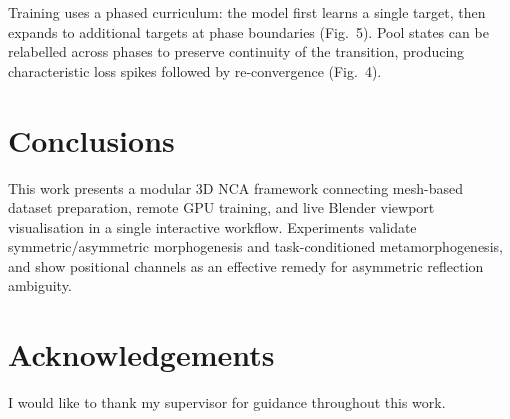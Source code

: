 \documentclass{ExcelAtFIT}
\begin{document}
Training uses a phased curriculum: the model first learns a single target, then expands to additional
targets at phase boundaries (Fig.~5). Pool states can be relabelled across phases to preserve continuity of the
transition, producing characteristic loss spikes followed by re-convergence (Fig.~4).

\section{Conclusions}

This work presents a modular 3D NCA framework connecting mesh-based dataset preparation, remote GPU
training, and live Blender viewport visualisation in a single interactive workflow.
Experiments validate symmetric/asymmetric morphogenesis and task-conditioned metamorphogenesis,
and show positional channels as an effective remedy for asymmetric reflection ambiguity.

\section*{Acknowledgements}
I would like to thank my supervisor for guidance throughout this work.



\end{document}
